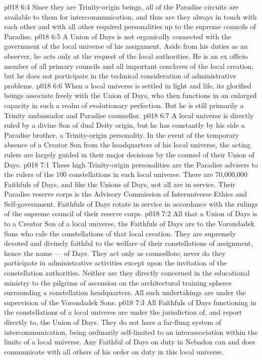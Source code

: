\vs p018 6:4 Since they are Trinity\hyp{}origin beings, all of the Paradise circuits are available to them for intercommunication, and thus are they always in touch with each other and with all other required personalities up to the supreme councils of Paradise.
\vs p018 6:5 \pc A Union of Days is not organically connected with the government of the local universe of his assignment. Aside from his duties as an observer, he acts only at the request of the local authorities. He is an ex officio member of all primary councils and all important conclaves of the local creation, but he does not participate in the technical consideration of administrative problems.
\vs p018 6:6 When a local universe is settled in light and life, its glorified beings associate freely with the Union of Days, who then functions in an enlarged capacity in such a realm of evolutionary perfection. But he is still primarily a Trinity ambassador and Paradise counsellor.
\vs p018 6:7 A local universe is directly ruled by a divine Son of dual Deity origin, but he has constantly by his side a Paradise brother, a Trinity\hyp{}origin personality. In the event of the temporary absence of a Creator Son from the headquarters of his local universe, the acting rulers are largely guided in their major decisions by the counsel of their Union of Days.
\vs p018 7:1 These high Trinity\hyp{}origin personalities are the Paradise advisers to the rulers of the 100 constellations in each local universe. There are 70,000,000 Faithfuls of Days, and like the Unions of Days, not all are in service. Their Paradise reserve corps is the Advisory Commission of Interuniverse Ethics and Self\hyp{}government. Faithfuls of Days rotate in service in accordance with the rulings of the supreme council of their reserve corps.
\vs p018 7:2 All that a Union of Days is to a Creator Son of a local universe, the Faithfuls of Days are to the Vorondadek Sons who rule the constellations of that local creation. They are supremely devoted and divinely faithful to the welfare of their constellations of assignment, hence the name ---  of Days. They act only as counsellors; never do they participate in administrative activities except upon the invitation of the constellation authorities. Neither are they directly concerned in the educational ministry to the pilgrims of ascension on the architectural training spheres surrounding a constellation headquarters. All such undertakings are under the supervision of the Vorondadek Sons.
\vs p018 7:3 All Faithfuls of Days functioning in the constellations of a local universe are under the jurisdiction of, and report directly to, the Union of Days. They do not have a far\hyp{}flung system of intercommunication, being ordinarily self\hyp{}limited to an interassociation within the limits of a local universe. Any Faithful of Days on duty in Nebadon can and does communicate with all others of his order on duty in this local universe.
